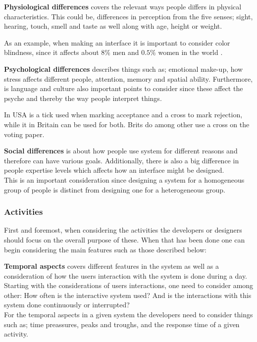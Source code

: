 \textbf{Physiological differences} covers the relevant ways people differs in physical characteristics.
This could be, differences in perception from the five senses; sight, hearing, touch, smell and taste as well along with age, height or weight.
\begin{example}
As an example, when making an interface it is important to consider color blindness, since it affects about $8\%$ men and $0.5\%$ women in the world \cite{ColourBlind}.
\end{example}

\textbf{Psychological differences} describes things such as; emotional make-up, how stress affects different people, attention, memory and spatial ability.
Furthermore, is language and culture also important points to consider since these affect the psyche and thereby the way people interpret things.
\begin{example}
	In USA is a tick used when marking acceptance and a cross to mark rejection, while it in Britain can be used for both. Brits do among other use a cross on the voting paper.
\end{example}


\textbf{Social differences} is about how people use system for different reasons and therefore can have various goals.
Additionally, there is also a big difference in people expertise levels which affects how an interface might be designed.
\\\indent
This is an important consideration since designing a system for a homogeneous group of people is  distinct from designing one for a heterogeneous group.

\subsubsection{Activities}
First and foremost, when considering the activities the developers or designers should focus on the overall purpose of these. When that has been done one can begin considering the main features such as those described below:

\textbf{Temporal aspects} covers different features in the system as well as a consideration of how the users interaction with the system is done during a day.
\\\indent
Starting with the considerations of users interactions, one need to consider among other: How often is the interactive system used? And is the interactions with this system done continuously or interrupted?
\\\indent
For the temporal aspects in a given system the developers need to consider things such as; time preassures, peaks and troughs, and the response time of a given activity.


